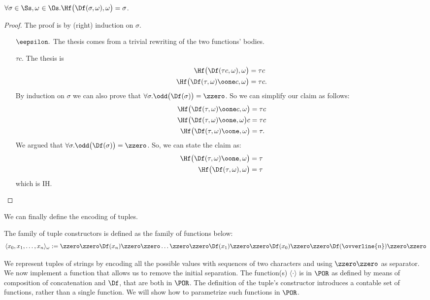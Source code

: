 \begin{prop}
$\forall \sigma \in {\Ss},
\omega \ { \in \Os.} \Hf\big(\Df(\sigma,\omega),\omega\big)
=\sigma$.
\end{prop}
\begin{proof}
The proof is by (right) induction on $\sigma$.
\begin{itemize}
\itemsep0em

\item[$\eepsilon.$] The thesis comes from a trivial
rewriting of the two functions' bodies.

\item[$\tau c.$] The thesis is
\begin{align*}
\Hf\big(\Df(\tau c,\omega),\omega\big) &= \tau c \\
%
\Hf\big(\Df(\tau,\omega)\oone c, \omega\big) &=
\tau c.
\end{align*}
By induction on $\sigma$ we can
also prove that
$\forall \sigma.\odd\big(\Df(\sigma)\big)=
{\zzero}$.
So we can simplify our claim as follows:
\begin{align*}
\Hf\big(\Df(\tau,\omega)\oone c,\omega\big) &=
\tau c \\
%
\Hf\big(\Df(\tau,\omega)\oone,\omega\big)c
&= \tau c \\
%
\Hf\big(\Df(\tau,\omega)\oone,\omega\big)
&= \tau.
\end{align*}
We argued that $\forall \sigma.\odd\big(\Df(\sigma)\big)
={\zzero}$.
So, we can state the claim as:
\begin{align*}
\Hf\big(\Df(\tau,\omega)\oone,\omega\big) &= \tau \\
%
\Hf\big(\Df(\tau,\omega),\omega\big) &= \tau
\end{align*}
which is IH.
\end{itemize}
\end{proof}





We can finally define the encoding
of tuples.

\begin{defn}
The family of tuple constructors
is defined
as the family of functions below:
$$
\langle x_0,x_1,\dots, x_n
\rangle_{{\omega}}
:= {\zzero\zzero \Df (x_n)
\zzero\zzero
\dots \zzero \zzero \Df(x_1) \zzero\zzero
\Df(x_0)\zzero\zzero\Df(\ovverline{n})
\zzero\zzero}
$$
\end{defn}
%
%
\noindent
We represent tuples of strings by encoding
all the possible values with sequences
of two characters
and using $\zzero\zzero$ as separator.
We now implement a function
that allows us to remove the
initial separation.
The function(s) $\langle \cdot\rangle$
is in $\POR$ as defined by means
of composition of concatenation
and $\Df$, that are both in $\POR$.
%
%
The definition of the tuple's constructor
introduces
a contable set of functions,
rather than a single function.
We will show how to parametrize
such functions in
$\POR$.



